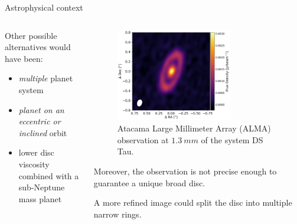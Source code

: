 \documentclass[9pt]{beamer}
\begin{document}
\begin{frame}{Astrophysical context}
\begin{columns}
\begin{column}{0.5\textwidth}
            Other possible alternatives would have been:
            \begin{itemize}
                \item \textit{multiple} planet system
                \item\textit{ planet on an eccentric or inclined} orbit
                \item lower disc viscosity combined with a sub-Neptune mass planet
            \end{itemize}
        \end{column}
        \begin{column}{0.5\textwidth}
            \begin{figure}
                \centering
                \includegraphics[width=0.7\textwidth]{dstau_alma_13mm}
                \caption{
                    Atacama Large Millimeter Array (ALMA) observation at
                    $\SI{1.3}{mm}$ of the system DS Tau.
                }
            \end{figure}
            Moreover, the observation is not precise enough to guarantee a
            unique broad disc.

            A more refined image could split the disc into multiple narrow
            rings.
        \end{column}
    \end{columns}
\end{frame}
\end{document}
